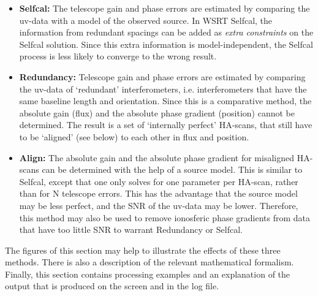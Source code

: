 \begin{itemize}  
\item {\bf Selfcal:}  
        The telescope gain and phase errors are estimated by comparing the
uv-data with a model of the observed source.  In WSRT Selfcal, the information
from redundant spacings can be added as {\em extra constraints} on the Selfcal
solution.  Since this extra information is model-independent, the Selfcal
process is less likely to converge to the wrong result.  

\item {\bf Redundancy:}  
        Telescope gain and phase errors are estimated by comparing the uv-data
of `redundant' interferometers, i.e.  interferometers that have the same
baseline length and orientation.  Since this is a comparative method, the
absolute gain (flux) and the absolute phase gradient (position) cannot be
determined.  The result is a set of `internally perfect' HA-scans, that still
have to be `aligned' (see below) to each other in flux and position.  

\item {\bf Align:}  
        The absolute gain and the absolute phase gradient for misaligned
HA-scans can be determined with the help of a source model.  This is similar to
Selfcal, except that one only solves for one parameter per HA-scan, rather than
for N telescope errors.  This has the advantage that the source model may be
less perfect, and the SNR of the uv-data may be lower.  Therefore, this method
may also be used to remove ionosferic phase gradients from data that have too
little SNR to warrant Redundancy or Selfcal.  

\end{itemize}  

        The figures of this section may help to illustrate the effects of these
three methods.  There is also a description of the relevant mathematical
formalism.  Finally, this section contains processing examples and an
explanation of the output that is produced on the screen and in the log file.  

  
  



  
  


